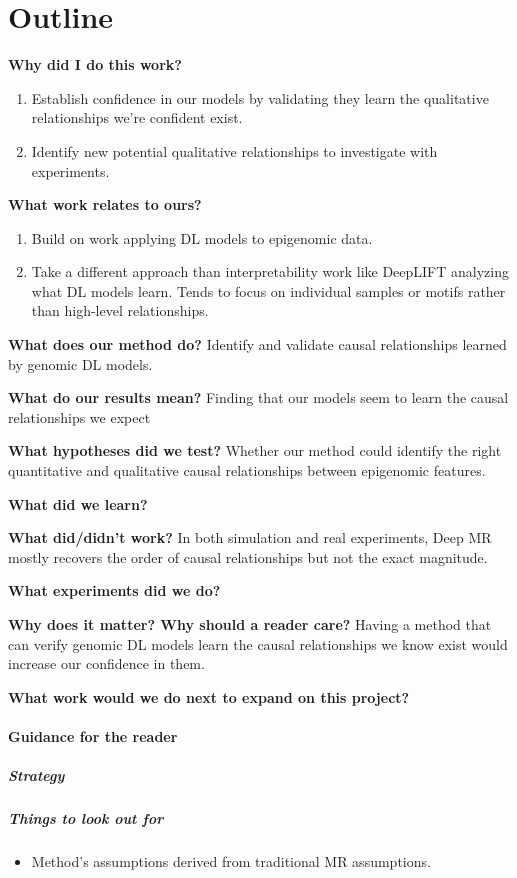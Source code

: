 \section{Outline}
\textbf{Why did I do this work?}

\begin{enumerate}
	\item Establish confidence in our models by validating they learn the qualitative relationships we're confident exist.
	\item Identify new potential qualitative relationships to investigate with experiments.
\end{enumerate}

\textbf{What work relates to ours?}
\begin{enumerate}
	\item Build on work applying DL models to epigenomic data. 
	\item Take a different approach than interpretability work like DeepLIFT analyzing what DL models learn. Tends to focus on individual samples or motifs rather than high-level relationships.
\end{enumerate}

\textbf{What does our method do?}
Identify and validate causal relationships learned by genomic DL models.

\textbf{What do our results mean?}
Finding that our models seem to learn the causal relationships we expect 

\textbf{What hypotheses did we test?} Whether our method could identify the right quantitative and qualitative causal relationships between epigenomic features.

\textbf{What did we learn?}

\textbf{What did/didn't work?}
In both simulation and real experiments, Deep MR mostly recovers the order of causal relationships but not the exact magnitude.

\textbf{What experiments did we do?}

\textbf{Why does it matter? Why should a reader care?}
Having a method that can verify genomic DL models learn the causal relationships we know exist would increase our confidence in them. 

\textbf{What work would we do next to expand on this project?}

\pagebreak

\paragraph{Guidance for the reader}
\subparagraph{Strategy} 
\subparagraph{Things to look out for}
\begin{itemize}
	\item Method's assumptions derived from traditional MR assumptions.
\end{itemize}

